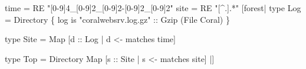 \begin{code}
[pads|
  type Coral = ...
|]
\mbox{}
time = RE "[0-9]{4}_[0-9]{2}_[0-9]{2}-[0-9]{2}_[0-9]{2}"
site = RE "[^.].*"
\mbox{}
[forest|
  type Log = Directory 
    \{ log is "coralwebsrv.log.gz" 
          :: Gzip (File Coral) \}

  type Site = 
    Map [d :: Log | d <- matches time]

  type Top = Directory
    Map [s :: Site | s <- matches site]
|]
\end{code}